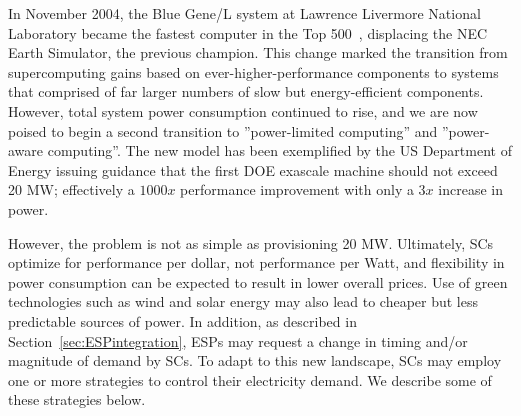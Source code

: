 In November 2004, the Blue Gene/L system at Lawrence Livermore National Laboratory
became the fastest computer in the Top 500~\cite{Top500}, displacing the NEC Earth Simulator,
the previous champion. This change marked the transition from supercomputing gains based
on ever-higher-performance components to systems that comprised of far larger numbers of 
slow but energy-efficient components. However, total system power consumption continued to rise,
and we are now poised to begin a second transition to ''power-limited computing'' and ''power-aware computing''. The new
model has been exemplified by the US Department of Energy issuing guidance that the first
DOE exascale machine should not exceed 20 MW; effectively a $1000x$ performance improvement
with only a $3x$ increase in power. 

However, the problem is not as simple as provisioning 20 MW. Ultimately, SCs optimize for
performance per dollar, not performance per Watt, and flexibility in power consumption
can be expected to result in lower overall prices. Use of green technologies such as
wind and solar energy may also lead to cheaper but less predictable sources of power.
In addition, as described in Section~\ref{sec:ESPintegration}, ESPs may request a change in timing and/or magnitude of demand by SCs. To adapt to this new landscape, SCs may employ one or more strategies to control their electricity demand. We describe some of these strategies below. 

